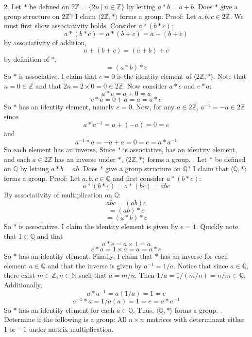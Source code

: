 \documentclass{article}
\begin{document}
2. Let $*$ be defined on $2\mathbb{Z} = \{2n \: | \: n \in \mathbb{Z}\}$ by letting $a * b = a + b$. Does $*$ give a group structure on $2\mathbb{Z}$?
\newline
I claim $\langle 2\mathbb{Z}, * \rangle$ forms a group. 
\newline
Proof: Let $a, b, c \in 2\mathbb{Z}$. We must first show associativity holds. Consider $a * (b * c)$:
\[a * (b * c) = a * (b + c) = a + (b + c)\]
by associativity of addition, 
\[a + ( b + c) = (a + b) + c\]
by definition of $*$,
\[ = (a * b) * c\]
So $*$ is associative.
\newline
I claim that $e = 0$ is the identity element of $\langle 2\mathbb{Z}, * \rangle$. Note that $n = 0 \in \mathbb{Z}$ and that $2n = 2\times 0 = 0 \in 2\mathbb{Z}$. Now consider $a * e$ and $e * a$:
\[a * e = a + 0 = a\]
\[e * a = 0 + a = a = a * e\]
So $*$ has an identity element, namely $e = 0$.
\newline
Now, for any $a \in 2\mathbb{Z}$, $a^{-1} = -a \in 2\mathbb{Z}$ since
\[a * a^{-1} = a + (-a) = 0 = e\]
and
\[a^{-1} * a = -a + a = 0 = e = a * a^{-1}\]
So each element has an inverse. Since $*$ is associative, has an identity element, and each $a \in 2\mathbb{Z}$ has an inverse under $*$, $\langle 2\mathbb{Z}, * \rangle$ forms a group.
\newline{}. Let $*$ be defined on $\mathbb{Q}$ by letting $a * b = ab$. Does $*$ give a group structure on $\mathbb{Q}$?
\newline
I claim that $\langle \mathbb{Q}, * \rangle$ forms a group. 
\newline
Proof: Let $a, b, c \in \mathbb{Q}$ and first consider $a * (b * c)$:
\[a * (b * c) = a * (bc) = abc\]
By associativity of multiplication on $\mathbb{Q}$:
\[abc = (ab)c\]
\[ = (ab) * c\]
\[ = (a * b) * c\]
So $*$ is associative.
\newline
I claim the identity element is given by $e = 1$. Quickly note that $1 \in \mathbb{Q}$ and that
\[a * e = a\times 1 = a\]
\[e * a = 1 \times a = a = a * e\]
So $*$ has an identity element.
\newline
Finally, I claim that $*$ has an inverse for each element $a \in \mathbb{Q}$ and that the inverse is given by $a^{-1} = 1/a$. Notice that since $a \in \mathbb{Q}$, there exist $m \in \mathbb{Z}, n \in \mathbb{N}$ such that $a = m/n$. Then $1/a = 1/(m/n) = n/m \in \mathbb{Q}$. Additionally,
\[a * a^{-1} = a( 1/a) = 1 = e\]
\[a^{-1} * a = 1/a(a) = 1 = e = a * a^{-1}\]
So $*$ has an identity element for each $a \in \mathbb{Q}$. Thus, $\langle \mathbb{Q}, * \rangle$ forms a group.
\newline{}. Determine if the following is a group: All $n \times n$ matrices with determinant either 1 or $-1$ under matrix multiplication.
\newline
\end{document}
